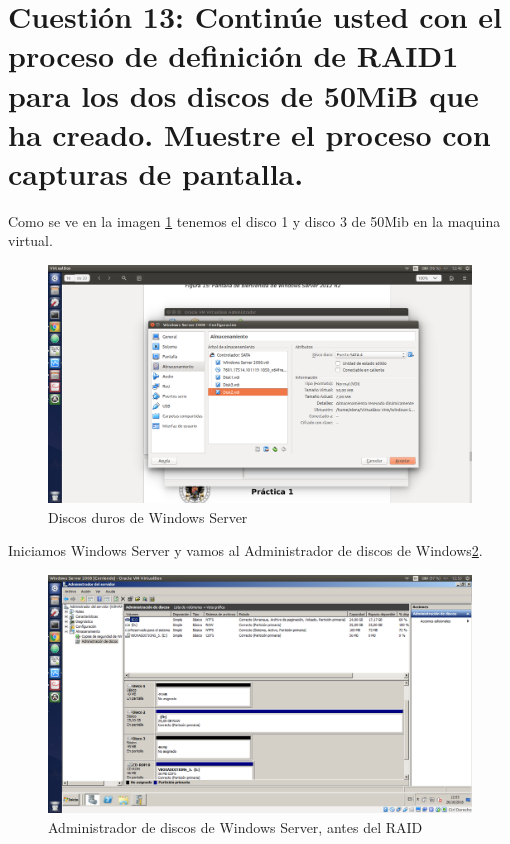 
\section{Cuestión 13: Continúe usted con el proceso de definición de RAID1 para los dos discos de 50MiB que ha creado. Muestre el proceso con capturas de pantalla.}

Como se ve en la imagen \ref{fig:P1_E13_1} tenemos el disco 1 y disco 3 de 50Mib en la maquina virtual.

\begin{figure}[H] %
\centering
\includegraphics[scale=0.3]{img/P1-ejercicio13-1.png} 
\caption{Discos duros de Windows Server} \label{fig:P1_E13_1}
\end{figure}

Iniciamos Windows Server y vamos al Administrador de discos de Windows\ref{fig:P1_E13_2}.

\begin{figure}[H] %
\centering
\includegraphics[scale=0.3]{img/P1-ejercicio13-2.png} 
\caption{Administrador de discos de Windows Server, antes del RAID} \label{fig:P1_E13_2}
\end{figure}

